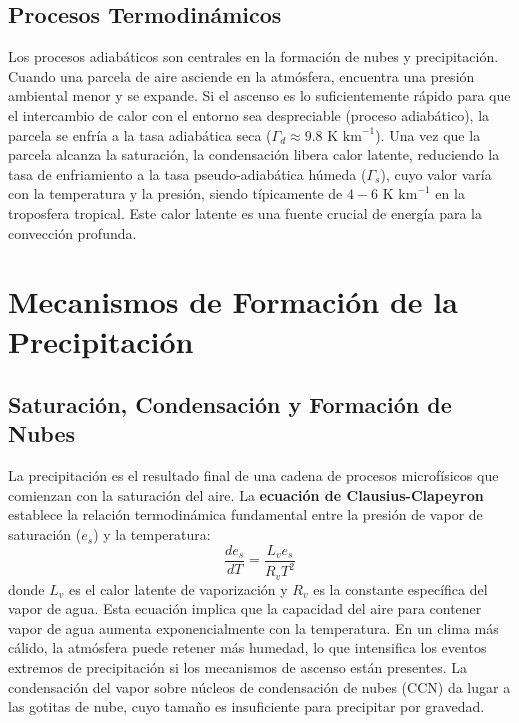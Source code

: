 \documentclass[titlepage,11pt]{report}
\begin{document}
\subsection{Procesos Termodinámicos}
Los procesos adiabáticos son centrales en la formación de nubes y precipitación. Cuando una parcela de aire asciende en la atmósfera, encuentra una presión ambiental menor y se expande. Si el ascenso es lo suficientemente rápido para que el intercambio de calor con el entorno sea despreciable (proceso adiabático), la parcela se enfría a la tasa adiabática seca (\(\Gamma_d \approx 9.8 \text{ K km}^{-1}\)). Una vez que la parcela alcanza la saturación, la condensación libera calor latente, reduciendo la tasa de enfriamiento a la tasa pseudo-adiabática húmeda (\(\Gamma_s\)), cuyo valor varía con la temperatura y la presión, siendo típicamente de \(4-6 \text{ K km}^{-1}\) en la troposfera tropical. Este calor latente es una fuente crucial de energía para la convección profunda.

\section{Mecanismos de Formación de la Precipitación}

\subsection{Saturación, Condensación y Formación de Nubes}
La precipitación es el resultado final de una cadena de procesos microfísicos que comienzan con la saturación del aire. La \textbf{ecuación de Clausius-Clapeyron} establece la relación termodinámica fundamental entre la presión de vapor de saturación (\(e_s\)) y la temperatura:
\begin{equation}
    \frac{de_s}{dT} = \frac{L_v e_s}{R_v T^2}
\end{equation}
donde \(L_v\) es el calor latente de vaporización y \(R_v\) es la constante específica del vapor de agua. Esta ecuación implica que la capacidad del aire para contener vapor de agua aumenta exponencialmente con la temperatura. En un clima más cálido, la atmósfera puede retener más humedad, lo que intensifica los eventos extremos de precipitación si los mecanismos de ascenso están presentes. La condensación del vapor sobre núcleos de condensación de nubes (CCN) da lugar a las gotitas de nube, cuyo tamaño es insuficiente para precipitar por gravedad.
\end{document}
